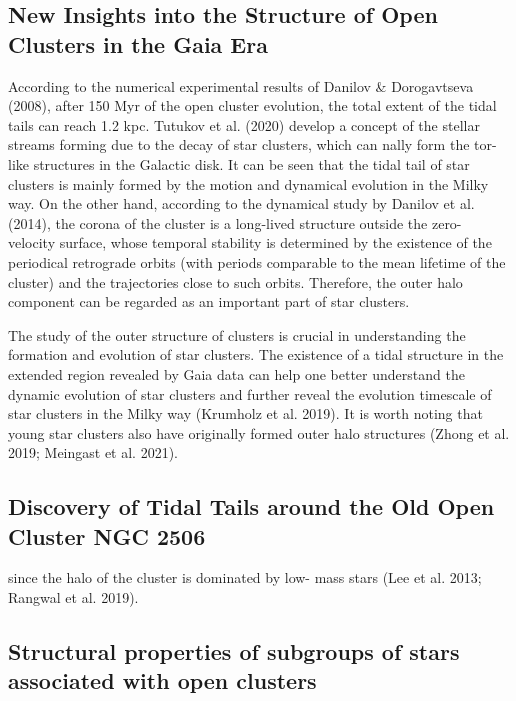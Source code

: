 \documentclass[../Main.tex]{subfiles}
\begin{document}
{\subsection{New Insights into the Structure of Open Clusters in the Gaia Era}

According to the numerical experimental results of Danilov &
Dorogavtseva (2008), after 150 Myr of the open cluster
evolution, the total extent of the tidal tails can reach 1.2 kpc.
Tutukov et al. (2020) develop a concept of the stellar streams
forming due to the decay of star clusters, which can nally
form the tor-like structures in the Galactic disk. It can be seen
that the tidal tail of star clusters is mainly formed by the motion
and dynamical evolution in the Milky way. On the other hand,
according to the dynamical study by Danilov et al. (2014), the
corona of the cluster is a long-lived structure outside the zero-
velocity surface, whose temporal stability is determined by the existence of the periodical retrograde orbits (with periods
comparable to the mean lifetime of the cluster) and the
trajectories close to such orbits. Therefore, the outer halo
component can be regarded as an important part of star clusters.

The study of the outer structure of clusters is crucial in
understanding the formation and evolution of star clusters. The
existence of a tidal structure in the extended region revealed by
Gaia data can help one better understand the dynamic evolution
of star clusters and further reveal the evolution timescale of star
clusters in the Milky way (Krumholz et al. 2019). It is worth
noting that young star clusters also have originally formed
outer halo structures (Zhong et al. 2019; Meingast et al. 2021).

\subsection{Discovery of Tidal Tails around the Old Open Cluster NGC 2506}

since the halo of the cluster is dominated by low-
mass stars (Lee et al. 2013; Rangwal et al. 2019).

\subsection{Structural properties of subgroups of stars associated with open clusters}

}
\end{document}
